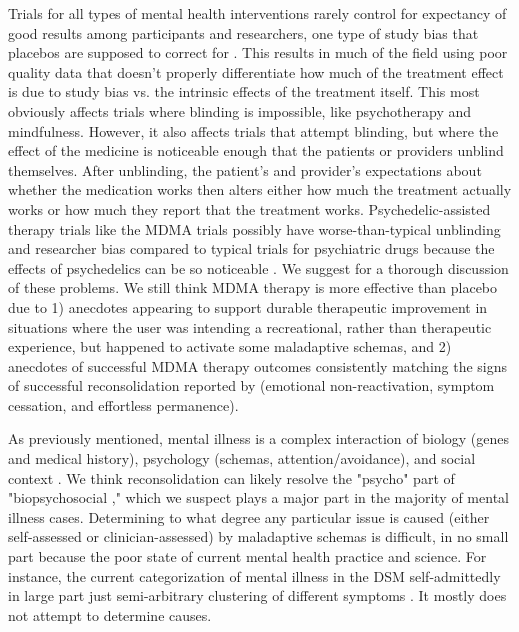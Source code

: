 \documentclass[12pt,letterpaper]{book}
\begin{document}
Trials for all types of mental health interventions rarely control for expectancy of good results among participants and researchers, one type of study bias that placebos are supposed to correct for \cite{hunekeExpectancy}. This results in much of the field using poor quality data that doesn't properly differentiate how much of the treatment effect is due to study bias vs. the intrinsic effects of the treatment itself. This most obviously affects trials where blinding is impossible, like psychotherapy and mindfulness. However, it also affects trials that attempt blinding, but where the effect of the medicine is noticeable enough that the patients or providers unblind themselves. After unblinding, the patient's and provider's expectations about whether the medication works then alters either how much the treatment actually works or how much they report that the treatment works. Psychedelic-assisted therapy trials like the MDMA trials possibly have worse-than-typical unblinding and researcher bias compared to typical trials for psychiatric drugs because the effects of psychedelics can be so noticeable \cite{adayMethodologicalRigor}. We suggest \textcite{vanElkMethodology} for a thorough discussion of these problems. We still think MDMA therapy is more effective than placebo due to 1) anecdotes appearing to support durable therapeutic improvement in situations where the user was intending a recreational, rather than therapeutic experience, but happened to activate some maladaptive schemas, and 2) anecdotes of successful MDMA therapy outcomes consistently matching the signs of successful reconsolidation reported by \textcite{eckerUnlocking} (emotional non-reactivation, symptom cessation, and effortless permanence).

As previously mentioned, mental illness is a complex interaction of biology (genes and medical history), psychology (schemas, attention/avoidance), and social context \cite{engel1977need}. We think reconsolidation can likely resolve the "psycho" part of "biopsychosocial \cite{carhart2019rebus,eckerUnlocking}," which we suspect plays a major part in the majority of mental illness cases. Determining to what degree any particular issue is caused (either self-assessed or clinician-assessed) by maladaptive schemas is difficult, in no small part because the poor state of current mental health practice and science. For instance, the current categorization of mental illness in the DSM self-admittedly in large part just semi-arbitrary clustering of different symptoms \cite{apaDSM}. It mostly does not attempt to determine causes.%
\end{document}
